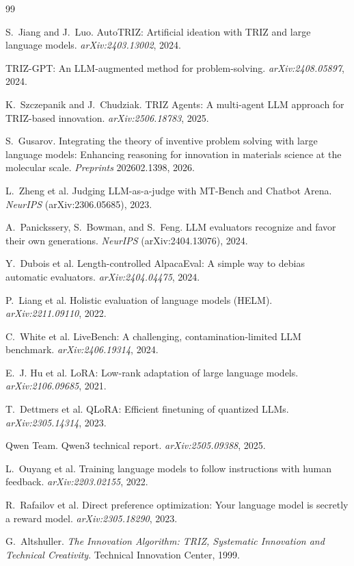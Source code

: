 \documentclass[11pt]{article}
\begin{document}
\begin{thebibliography}{99}

S.~Jiang and J.~Luo.
\newblock AutoTRIZ: Artificial ideation with TRIZ and large language
  models.
\newblock \emph{arXiv:2403.13002}, 2024.

\newblock TRIZ-GPT: An LLM-augmented method for problem-solving.
\newblock \emph{arXiv:2408.05897}, 2024.

K.~Szczepanik and J.~Chudziak.
\newblock TRIZ Agents: A multi-agent LLM approach for TRIZ-based
  innovation.
\newblock \emph{arXiv:2506.18783}, 2025.

S.~Gusarov.
\newblock Integrating the theory of inventive problem solving with large
  language models: Enhancing reasoning for innovation in materials
  science at the molecular scale.
\newblock \emph{Preprints} 202602.1398, 2026.

L.~Zheng et al.
\newblock Judging LLM-as-a-judge with MT-Bench and Chatbot Arena.
\newblock \emph{NeurIPS} (arXiv:2306.05685), 2023.

A.~Panickssery, S.~Bowman, and S.~Feng.
\newblock LLM evaluators recognize and favor their own generations.
\newblock \emph{NeurIPS} (arXiv:2404.13076), 2024.

Y.~Dubois et al.
\newblock Length-controlled AlpacaEval: A simple way to debias automatic
  evaluators.
\newblock \emph{arXiv:2404.04475}, 2024.

P.~Liang et al.
\newblock Holistic evaluation of language models (HELM).
\newblock \emph{arXiv:2211.09110}, 2022.

C.~White et al.
\newblock LiveBench: A challenging, contamination-limited LLM benchmark.
\newblock \emph{arXiv:2406.19314}, 2024.

E.~J. Hu et al.
\newblock LoRA: Low-rank adaptation of large language models.
\newblock \emph{arXiv:2106.09685}, 2021.

T.~Dettmers et al.
\newblock QLoRA: Efficient finetuning of quantized LLMs.
\newblock \emph{arXiv:2305.14314}, 2023.

Qwen Team.
\newblock Qwen3 technical report.
\newblock \emph{arXiv:2505.09388}, 2025.

L.~Ouyang et al.
\newblock Training language models to follow instructions with human
  feedback.
\newblock \emph{arXiv:2203.02155}, 2022.

R.~Rafailov et al.
\newblock Direct preference optimization: Your language model is secretly
  a reward model.
\newblock \emph{arXiv:2305.18290}, 2023.

G.~Altshuller.
\newblock \emph{The Innovation Algorithm: TRIZ, Systematic Innovation and
  Technical Creativity}.
\newblock Technical Innovation Center, 1999.

\end{thebibliography}
\end{document}
